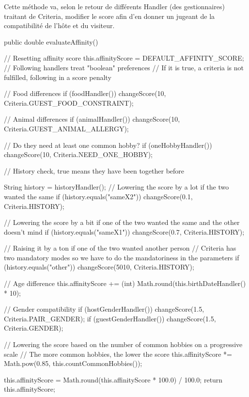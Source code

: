 \documentclass{mytex}
\begin{document}
Cette méthode va, selon le retour de différents Handler (des gestionnaires) traitant de Criteria, modifier le score afin d'en donner un jugeant de la compatibilité de l'hôte et du visiteur.

\begin{codebox}
public double evaluateAffinity() {
	// Resetting affinity score
	this.affinityScore = DEFAULT_AFFINITY_SCORE; 
	// Following handlers treat "boolean" preferences
	// If it is true, a criteria is not fulfilled, following in a score penalty
	
	// Food differences
	if (foodHandler()) changeScore(10, Criteria.GUEST_FOOD_CONSTRAINT);
	
	// Animal differences
	if (animalHandler()) changeScore(10, Criteria.GUEST_ANIMAL_ALLERGY);
	
	// Do they need at least one common hobby?
	if (oneHobbyHandler()) changeScore(10, Criteria.NEED_ONE_HOBBY);
	
	// History check, true means they have been together before

	String history = historyHandler();
	// Lowering the score by a lot if the two wanted the same
	if (history.equals("sameX2")) changeScore(0.1, Criteria.HISTORY);
	
	// Lowering the score by a bit if one of the two wanted the same and the other doesn't mind
	if (history.equals("sameX1")) changeScore(0.7, Criteria.HISTORY);
	
	// Raising it by a ton if one of the two wanted another person
	// Criteria has two mandatory modes so we have to do the mandatoriness in the parameters 
	if (history.equals("other")) changeScore(5010, Criteria.HISTORY);

	// Age difference
	this.affinityScore += (int) Math.round(this.birthDateHandler() * 10);
	
	// Gender compatibility
	if (hostGenderHandler()) changeScore(1.5, Criteria.PAIR_GENDER);
	if (guestGenderHandler()) changeScore(1.5, Criteria.GENDER);
	
	// Lowering the score based on the number of common hobbies on a progressive scale
	// The more common hobbies, the lower the score
	this.affinityScore *= Math.pow(0.85, this.countCommonHobbies());
	
	this.affinityScore = Math.round(this.affinityScore * 100.0) / 100.0;
	return this.affinityScore;
}
\end{codebox}

\end{document}
